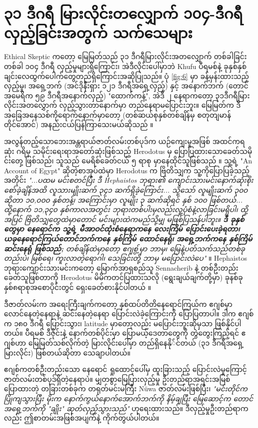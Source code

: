 \documentclass[10pt,twocolumn,letterpaper]{article}
\begin{document}
\section{၃၁ ဒီဂရီ မြားလိုင်းတလျှောက် ၁၀၄-ဒီဂရီလှည့်ခြင်းအတွက် သက်သေများ}

Ethical Skeptic ကတော့ မြေမြတ်သည် ၃၁‌ ဒီဂရီမြားလိုင်းအတလျှောက် တစ်ခါခြင်းတစ်ခါ ၁၀၄ ဒီဂရီ လှည့်မှုများရှိကြောင်း၊ အဲဒီလိုင်းပေါ်မှာဘဲ Khufu ပီရမစ်နဲ့ ခုနှစ်နှစ်ချင်းလေထွက်ပေါက်တွေတည်ရှိကြောင်းအဆိုပြုသည်။ ပုံ \ref{fig:6} မှာ ခန့်မှန်းထားသည့် လှည့်မှု၊ အရှေ့ဘက် (အင်ဒိုနီးရှား ၁၂၁ ဒီဂရီအရှေ့လှည့်) နှင့် အနောက်ဘက် (တောင်အမေရိက ၅၉ ဒီဂရီအနောက်လှည့်) "ထောက်ကန့်", အဲဒီ ၂ နေရာကတော့ ၃၁ဒီဂရီမြားလိုင်းအတလွှောက် လှည့်သွားတာနောက်မှာ တည်နေရာမပြောင်းဘူး။ မြေမြတ်က ဒီအခြေအနေသစ်ကိုရောက်နောက်မှာတော့ (တစ်ဆယ်စုနှစ်တစ်ချိန်မှ စတုတျမာန်တိုင်အောင်) အနည်းငယ်ပြန်ကြာသေးမယ်ဆိုသည် \cite{150}။

အလွန်တည့်သောဘေးအန္တရာယ်ဇာတ်လမ်းတစ်ပုဒ်က ယဉ်ကျေးမှုအဖြစ် အထင်ကရဆုံး ဂရိမှ သမိုင်းရေးရာအတော်ဆုံးဖြစ်သည့် Herodotus မှ ပြောပြထားသောခေတ်သမိုင်းတှေ့ ဖြစ်သည်၊ သူသည် မေရိစ်ခေတ်ငယ် ၅ ရာစု မှာနေထိုင်သူဖြစ်သည် \cite{31}။ သူ့ရဲ့ "An Account of Egypt" ဆိုတဲ့စာအုပ်ထဲမှာ Herodotus က ဗြိတိသျှက သူ့ကိုပြောပြခဲ့သည့်အတိုင်း \textit{"...ပထမ မင်းစတင်ပြီး ဒီ Hephaistos ဘုရား၏ ကျောင်းသားမင်းနောက်ဆုံးစိုးစော်ခဲ့ချိန်အထိ လူသားမျိုးဆက် ၃၄၁ ဆက်ရှိခဲ့ကြောင်း... သို့သော် လူမျိုးဆက် ၃၀၀ ဆိုတာ ၁၀,၀၀၀ နှစ်တန့်၊ အကြောင်းမှာ လူမျိုး ၃ ဆက်ဆိုရင် နှစ် ၁၀၀ ဖြစ်တယ်... ထို့နောက် ၁၁,၃၄၀ နှစ်ကာလအတွင်း ဘုရားတစ်ပါးမှလည်းလူ့ပုံစံနဲ့လာခြင်းမရှိပါ၊ ထို့အပြင် ဗြိတိသျှတွေထဲမှာတောင် မင်းများထဲကမည်သို့မျှ မဖြစ်ပြသန်ပါဘူး။ \textbf{ဒီ ခုနှစ်တွေမှာ နေရောင်က သူ့ရဲ့ မီအာဝင်ထုံးစံနေရာကနေ လေးကြိမ် ပြောင်းပေးခဲ့ရတာ၊ ယခုနေရောင်ကြယ်တောင်ဘက်ကနေ နှစ်ကြိမ် ထောင်နေရုံ၊ အရှေ့ဘက်ကနေ နှစ်ကြိမ်ဆင်းနေရုံ ဖြစ်သည်;} တစ်ချိန်ထဲမှာတော့ ဧဂျစ္ပ့်မှာ ဘာမှ၊ မြေနဲ့ပတ်သက်သည်တစ်ခုတည်းပဲ၊ မြစ်ရေ၊ ကူးလာတဲ့ရောဂါ၊ သေခြင်းတို့ ဘာမှ မပြောင်းလဲပေ"} \cite{32}။ Hephaistos ဘုရားကျောင်းသားမင်းကတော့ မြောက်အာရှစည်သူ Sennacherib နဲ့ တစ်ဦးတည်း ခေတ်သူဖြစ်တာကို Herodotus မိမိကတင်ပြထားသလို (ရွေးချယ်ချက်တို့မှာ) ခုနစ်ခုနှစ်၈ရာစုအစောပိုင်းတွင် ရှေးခေတ်စားနိုင်ပါတယ် \cite{32,33,34}။

ဒီဇာတ်လမ်းက အရေးကြီးချက်ကတော့ နှစ်ထပ်တိတိနေရောင်ကြယ်က ဧဂျစ်မှာ လောင်နေတဲ့နေရာနဲ့ ဆင်းနေတဲ့နေရာ ပြောင်းလဲခဲ့ကြောင်းကို ပြောပြတာပါ။ ဒါက ဧဂျစ်က ၁၈၀ ဒီဂရီ ပြောင်းသွား၊ latitude မှာတော့လည်း မပြောင်းဘူးဆိုမှသာ ဖြစ်နိုင်ပါတယ်။ ပီရမစ် ဒီဇိုင်းနဲ့ နောက်တစ်ပိုင်းမှာ ပြောမယ့်ဒေတာတွေကို တွဲတွေးကြည့်ရင် ဧဂျစ်ဟာ မြေမြတ်သစ်လိုက်တဲ့ မြားလိုင်းပေါ်မှာ တည်ရှိနေနို်င်တယ် (၃၁ ဒီဂရီအရှေ့မြားလိုင်း) ဖြစ်တယ်ဆိုတာ သေချာပါတယ်။

ဧဂျစ်ကတစ်ဦးတည်းသော နေရောင် ရှုထောင့်ပေါ်မှ ထူးခြားသည့် ပြောင်းလဲမှုကြောင့် ဇာတ်လမ်းတစ်ပုဒ်ရှိတဲ့နေရာပဲ။ မျှတစွာမြေပြားလှည့်မှု ဦးတည်ရာအရင်းအမြစ်ပြောထားတဲ့ တခြားတစ်ခုက တရုတ်မင်းမကြီး Nüwa ဇာတ်လမ်းဖြစ်ပြီး၊ \textit{"မင်းတိုင်က ပြိုကျသွားပြီး မိုးက နောက်ကွယ်နောက်အောက်ဘက်ကို နိမ့်ချပြီး မြေဆောင့်က တောင်အရှေ့ဘက်ကို "ချိုး" ဆုတ်လှည့်သွားသည်"} \cite{8} ဟုရေးထားသည်။ ဒီလှည့်မှုဦးတည်ရာကလည်း ဤစာတမ်းအဖြစ်အပျက်နဲ့ ကိုက်တွယ်ပါတယ်။
\end{document}
